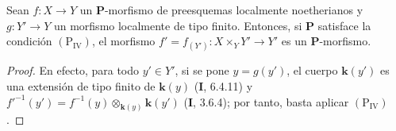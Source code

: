 \begin{lemma}[7.3.7]
\label{IV.2.s7.3.7-fr}
Sean $f:X\to Y$ un $\boldsymbol P$-morfismo de preesquemas
localmente noetherianos y $g:Y'\to Y$ un morfismo localmente de tipo
finito. Entonces, si $\boldsymbol P$ satisface la condición
$(\mathrm P_{\mathrm{IV}})$, el morfismo
$f'=f_{(Y')}:X\times_Y Y'\to Y'$ es un $\boldsymbol P$-morfismo.
\end{lemma}

\begin{proof}
En efecto, para todo $y'\in Y'$, si se pone $y=g(y')$, el cuerpo
$\boldsymbol{k}(y')$ es una extensión de tipo finito de $\boldsymbol{k}(y)$ (\textbf I, 6.4.11) y
$f'^{-1}(y')=f^{-1}(y)\otimes_{\mathbf{k}(y)}\boldsymbol{k}(y')$ (\textbf I, 3.6.4); por tanto,
basta aplicar $(\mathrm P_{\mathrm{IV}})$.
\end{proof}
